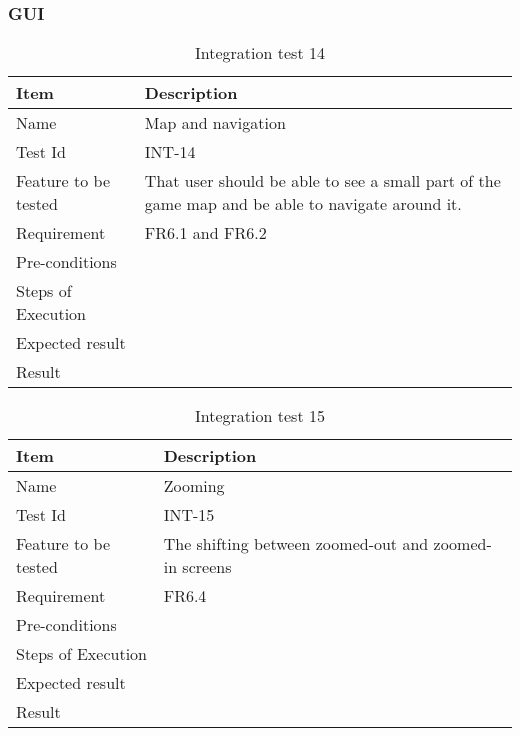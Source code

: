 \subsubsection{GUI}

\begin{table}[H]
\centering
	\begin{tabular}{ l | p{8cm} }
		\hline
		{\bf Item} & {\bf Description} \\ \hline
		Name & Map and navigation\\ 
		Test Id & INT-14 \\ 
		Feature to be tested & That user should be able to see a small part of the game map and be able to navigate around it.\\ 
		Requirement & FR6.1 and FR6.2 \\ 
		Pre-conditions & \\ 
		Steps of Execution & \\ 
		Expected result & \\ 
		Result & \\ 
	\end{tabular}
	\caption{Integration test 14}
\end{table}

\begin{table}[H]
\centering
	\begin{tabular}{ l | p{8cm} }
		\hline
		{\bf Item} & {\bf Description} \\ \hline
		Name & Zooming \\ 
		Test Id & INT-15 \\ 
		Feature to be tested & The shifting between zoomed-out and zoomed-in screens \\ 
		Requirement & FR6.4 \\ 
		Pre-conditions & \\ 
		Steps of Execution & \\ 
		Expected result & \\ 
		Result & \\ 
	\end{tabular}
	\caption{Integration test 15}
\end{table}